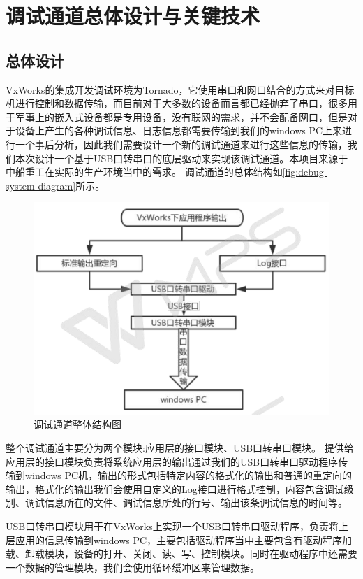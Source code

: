 \chapter{调试通道总体设计与关键技术}

\section{总体设计}
	VxWorks的集成开发调试环境为Tornado，它使用串口和网口结合的方式来对目标机进行控制和数据传输，而目前对于大多数的设备而言都已经抛弃了串口，很多用于军事上的嵌入式设备都是专用设备，没有联网的需求，并不会配备网口，但是对于设备上产生的各种调试信息、日志信息都需要传输到我们的windows PC上来进行一个事后分析，因此我们需要设计一个新的调试通道来进行这些信息的传输，我们本次设计一个基于USB口转串口的底层驱动来实现该调试通道。本项目来源于中船重工在实际的生产环境当中的需求。
	调试通道的总体结构如\autoref{fig:debug-system-diagram}所示。
\begin{figure}[!h]
\centering
\includegraphics[width=.9\textwidth]{./graphics/debug-system-diagram.pdf}
\caption{调试通道整体结构图}\label{fig:debug-system-diagram}
\end{figure}
	
	整个调试通道主要分为两个模块:应用层的接口模块、USB口转串口模块。
	提供给应用层的接口模块负责将系统应用层的输出通过我们的USB口转串口驱动程序传输到windows PC机，输出的形式包括特定内容的格式化的输出和普通的重定向的输出，格式化的输出我们会使用自定义的Log接口进行格式控制，内容包含调试级别、调试信息所在的文件、调试信息所处的行号、输出该条调试信息的时间等。
	
	USB口转串口模块用于在VxWorks上实现一个USB口转串口驱动程序，负责将上层应用的信息传输到windows PC，主要包括驱动程序当中主要包含有驱动程序加载、卸载模块，设备的打开、关闭、读、写、控制模块。同时在驱动程序中还需要一个数据的管理模块，我们会使用循环缓冲区来管理数据。


